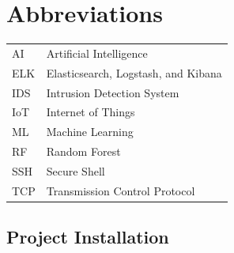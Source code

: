 \documentclass[11pt,a4paper]{report}
\begin{document}
\listoffigures
\clearpage

\listoftables
\clearpage

\chapter*{Abbreviations}
\begin{tabular}{ll}
AI & Artificial Intelligence\\
ELK & Elasticsearch, Logstash, and Kibana\\
IDS & Intrusion Detection System\\
IoT & Internet of Things\\
ML & Machine Learning\\
RF & Random Forest\\
SSH & Secure Shell\\
TCP & Transmission Control Protocol\\
\end{tabular}
\clearpage
{}

\pagebreak
{}
 
 
 

       

% 


\begin{appendices}
  \chapter{Project Installation}
\end{appendices}
\clearpage


\end{document}
